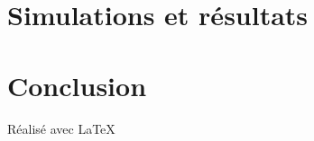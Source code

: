 \documentclass[a4paper]{report}
\theoremstyle{definition}
\begin{document}
\tableofcontents
\thispagestyle{empty}











\chapter{Simulations et r\'esultats}\label{simu}



\chapter{Conclusion}\label{conclusion}





\vfill
{\raggedleft R\'ealis\'e avec \LaTeX{} \par}
\end{document}
